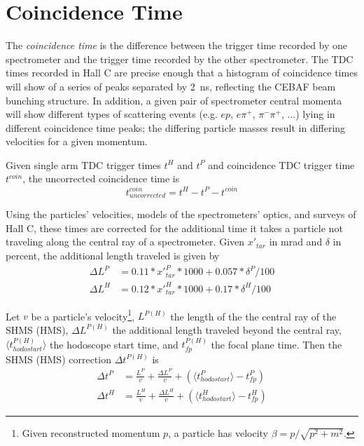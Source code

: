 \section{Coincidence Time}
The \textit{coincidence time} is the difference between the trigger time
recorded by one spectrometer and the trigger time recorded by the other
spectrometer.
The TDC times recorded in Hall C are precise enough that a histogram of
coincidence times will show of a series of peaks separated by
\SI{2}{\nano\second}, reflecting the CEBAF beam bunching structure.
In addition, a given pair of spectrometer central momenta will show different
types of scattering events (e.g. $ep$, $e\pi^+$, $\pi^-\pi^+$, ...) lying in
different coincidence time peaks; the differing particle masses result in
differing velocities for a given momentum.

Given single arm TDC trigger times $t^H$ and $t^P$ and coincidence TDC trigger
time $t^{coin}$, the uncorrected coincidence time is
\begin{equation}
    t^{coin}_{uncorrected} = t^H - t^P - t^{coin}
\end{equation}

Using the particles' velocities, models of the spectrometers' optics, and
surveys of Hall C, these times are corrected for the additional time it takes a
particle not traveling along the central ray of a spectrometer.
Given $x'_{tar}$ in \si{\milli\radian} and $\delta$ in percent, the additional
length traveled is given by
\begin{align}
    \Delta L^P &= 0.11 * x'^{P}_{tar} * 1000 + 0.057 * \delta^{P}/100 \\
    \Delta L^H &= 0.12 * x'^{H}_{tar}* 1000 + 0.17 * \delta^{H}/100
\end{align}

Let $v$ be a particle's velocity\footnote{Given reconstructed momentum $p$, a
 particle has velocity $\beta = p / \sqrt{p^2+m^2}$.},
$L^{P(H)}$ the length of the the central ray of the SHMS (HMS),
$\Delta L^{P(H)}$ the additional length traveled beyond the central ray,
$\langle t^{P(H)}_{hodostart}\rangle$ the hodoscope start time, and
$t^{P(H)}_{fp}$ the focal plane time.
Then the SHMS (HMS) correction $\Delta t^{P(H)}$ is
\begin{align}
    \Delta t^P &= \frac{L^P}{v} + \frac{\Delta L^P}{v} + \left( \langle t^{P}_{hodostart}\rangle - t^{P}_{fp} \right) \\
    \Delta t^H &= \frac{L^H}{v} + \frac{\Delta L^H}{v} + \left( \langle t^{H}_{hodostart}\rangle - t^{H}_{fp} \right)
\end{align}

